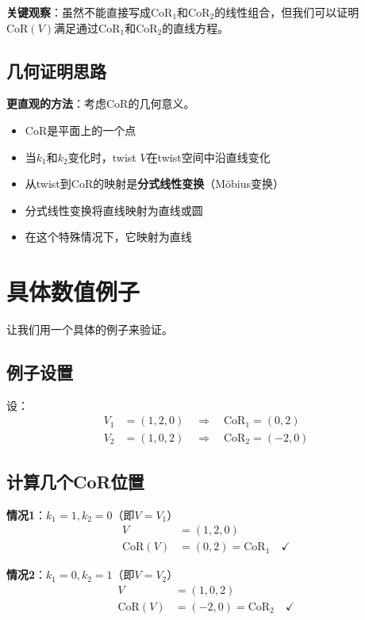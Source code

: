 \documentclass[12pt,a4paper]{article}
\begin{document}
\textbf{关键观察}：虽然不能直接写成$\text{CoR}_1$和$\text{CoR}_2$的线性组合，但我们可以证明$\text{CoR}(V)$满足通过$\text{CoR}_1$和$\text{CoR}_2$的直线方程。

\subsection{几何证明思路}

\textbf{更直观的方法}：考虑CoR的几何意义。

\begin{itemize}
\item CoR是平面上的一个点
\item 当$k_1$和$k_2$变化时，twist $V$在twist空间中沿直线变化
\item 从twist到CoR的映射是\textbf{分式线性变换}（Möbius变换）
\item 分式线性变换将直线映射为直线或圆
\item 在这个特殊情况下，它映射为直线
\end{itemize}

\section{具体数值例子}

让我们用一个具体的例子来验证。

\subsection{例子设置}

设：
\begin{align}
V_1 &= (1, 2, 0) \quad \Rightarrow \quad \text{CoR}_1 = (0, 2) \\
V_2 &= (1, 0, 2) \quad \Rightarrow \quad \text{CoR}_2 = (-2, 0)
\end{align}

\subsection{计算几个CoR位置}

\textbf{情况1}：$k_1 = 1, k_2 = 0$（即$V = V_1$）
\begin{align}
V &= (1, 2, 0) \\
\text{CoR}(V) &= (0, 2) = \text{CoR}_1 \quad \checkmark
\end{align}

\textbf{情况2}：$k_1 = 0, k_2 = 1$（即$V = V_2$）
\begin{align}
V &= (1, 0, 2) \\
\text{CoR}(V) &= (-2, 0) = \text{CoR}_2 \quad \checkmark
\end{align}
\end{document}
